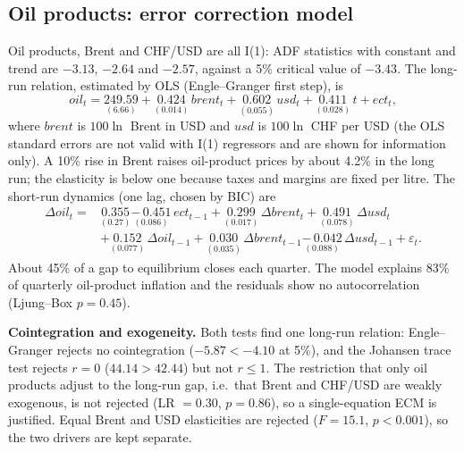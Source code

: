\documentclass[11pt,a4paper]{article}
\begin{document}
\subsection{Oil products: error correction model}
Oil products, Brent and CHF/USD are all I(1): ADF statistics with constant and trend are $-3.13$,
$-2.64$ and $-2.57$, against a 5\% critical value of $-3.43$. The long-run relation, estimated by OLS
(Engle--Granger first step), is
\begin{equation}\label{eq:lr}
  oil_t = \underset{(6.66)}{249.59} + \underset{(0.014)}{0.424}\, brent_t + \underset{(0.055)}{0.602}\, usd_t
          + \underset{(0.028)}{0.411}\, t + ect_t ,
\end{equation}
where $brent$ is $100\ln$ Brent in USD and $usd$ is $100\ln$ CHF per USD (the OLS standard errors are
not valid with I(1) regressors and are shown for information only). A 10\% rise in Brent raises
oil-product prices by about 4.2\% in the long run; the elasticity is below one because taxes and
margins are fixed per litre. The short-run dynamics (one lag, chosen by BIC) are
\begin{equation}\label{eq:sr}
  \begin{split}
  \Delta oil_t = {}& \underset{(0.27)}{0.355} \underset{(0.086)}{-\,0.451}\, ect_{t-1}
    + \underset{(0.017)}{0.299}\,\Delta brent_t + \underset{(0.078)}{0.491}\,\Delta usd_t \\
    &+ \underset{(0.077)}{0.152}\,\Delta oil_{t-1} + \underset{(0.035)}{0.030}\,\Delta brent_{t-1}
    \underset{(0.088)}{-\,0.042}\,\Delta usd_{t-1} + \varepsilon_t .
  \end{split}
\end{equation}
About 45\% of a gap to equilibrium closes each quarter. The model explains 83\% of quarterly
oil-product inflation and the residuals show no autocorrelation (Ljung--Box $p = 0.45$).

\textbf{Cointegration and exogeneity.} Both tests find one long-run relation: Engle--Granger rejects
no cointegration ($-5.87 < -4.10$ at 5\%), and the Johansen trace test rejects $r = 0$
($44.14 > 42.44$) but not $r \le 1$. The restriction that only oil products adjust to the long-run
gap, i.e.\ that Brent and CHF/USD are weakly exogenous, is not rejected (LR $= 0.30$, $p = 0.86$), so a
single-equation ECM is justified. Equal Brent and USD elasticities are rejected ($F = 15.1$,
$p < 0.001$), so the two drivers are kept separate.
\end{document}
